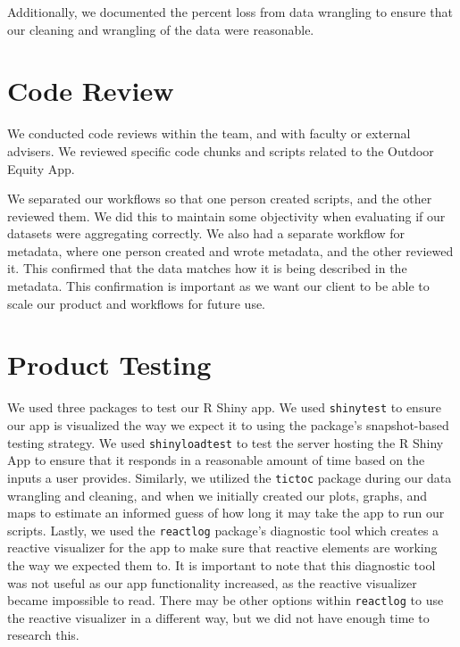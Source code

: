 \documentclass[
  11 pt,
  openany]{book}
\begin{document}
Additionally, we documented the percent loss from data wrangling to ensure that our cleaning and wrangling of the data were reasonable.

\hypertarget{code-review}{%
\section{Code Review}\label{code-review}}

We conducted code reviews within the team, and with faculty or external advisers. We reviewed specific code chunks and scripts related to the Outdoor Equity App.

We separated our workflows so that one person created scripts, and the other reviewed them. We did this to maintain some objectivity when evaluating if our datasets were aggregating correctly. We also had a separate workflow for metadata, where one person created and wrote metadata, and the other reviewed it. This confirmed that the data matches how it is being described in the metadata. This confirmation is important as we want our client to be able to scale our product and workflows for future use.

\hypertarget{product-testing}{%
\section{Product Testing}\label{product-testing}}

We used three packages to test our R Shiny app. We used \texttt{shinytest} \citep{R-shinytest} to ensure our app is visualized the way we expect it to using the package's snapshot-based testing strategy. We used \texttt{shinyloadtest} \citep{R-shinyloadtest} to test the server hosting the R Shiny App to ensure that it responds in a reasonable amount of time based on the inputs a user provides. Similarly, we utilized the \texttt{tictoc} \citep{R-tictoc} package during our data wrangling and cleaning, and when we initially created our plots, graphs, and maps to estimate an informed guess of how long it may take the app to run our scripts. Lastly, we used the \texttt{reactlog} \citep{R-reactlog} package's diagnostic tool which creates a reactive visualizer for the app to make sure that reactive elements are working the way we expected them to. It is important to note that this diagnostic tool was not useful as our app functionality increased, as the reactive visualizer became impossible to read. There may be other options within \texttt{reactlog} to use the reactive visualizer in a different way, but we did not have enough time to research this.
\end{document}
